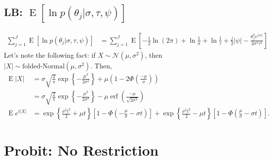 \documentclass[11pt]{article}
\newcommand{\opn}{\operatorname}
\begin{document}
\subsection{LB: $\opn{E}\left[\ln p\left(\theta_{j}|\sigma, \tau, \psi\right)\right]$}
\begin{align*}
  \sum_{j=1}^{J}\opn{E}\left[\ln p\left(\theta_{j}|\sigma, \tau, \psi\right)\right] &= \sum_{j=1}^{J}\opn{E}\left[-\frac{1}{2}\ln\left(2\pi\right) +\ln \frac{1}{\sigma} + \ln \frac{1}{\tau} +\frac{j}{2}\left|\psi\right| -\frac{\theta_{j}^{2}e^{j\left|\psi\right|}}{2\sigma^{2}\tau^{2}} \right]
\end{align*}
Let's note the following fact: if $X \sim \mathcal{N}\left(\mu, \sigma^{2}\right)$, then $\left|X\right| \sim \text{folded-Normal}\left(\mu, \sigma^{2}\right)$. Then,
\begin{align*}
  \opn{E}\left|X\right| &= \sigma \sqrt{\frac{2}{\pi}}\exp \left\{-\frac{\mu^{2}}{2\sigma^{2}} \right\} + \mu \left(1-2\Phi\left(\frac{-\mu}{\sigma}\right)\right)\\
  &= \sigma \sqrt{\frac{2}{\pi}}\exp \left\{-\frac{\mu^{2}}{2\sigma^{2}} \right\} - \mu \opn{erf} \left(\frac{-\mu}{\sqrt{2\sigma^{2}}}\right)\\
  \opn{E}e^{t\left|X\right|} &= \exp\left\{\frac{\sigma^{2}t^{2}}{2} + \mu t \right\} \left[1-\Phi\left(-\frac{\mu}{\sigma}-\sigma t\right) \right] + \exp\left\{\frac{\sigma^{2}t^{2}}{2} -\mu t \right\}\left[1-\Phi\left(\frac{\mu}{\sigma}-\sigma t\right) \right].
\end{align*}

\section{Probit: No Restriction}
\end{document}

